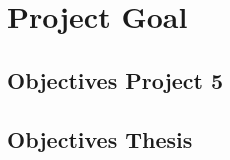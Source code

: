 \section{Project Goal}
\label{sec:project_goal}


\subsection{Objectives Project 5}
\label{subsec:objectives_project_5}


\subsection{Objectives Thesis}
\label{subsec:objectives_thesis}


